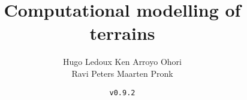 \documentclass[
  fontsize=10pt, %
  twoside=true, %
  secnumdepth=1, %
  numbers=noenddot, %
]{kaobook}
\begin{document}


\title{Computational modelling of terrains}
\author{Hugo Ledoux \hspace{10mm} Ken Arroyo Ohori\\ Ravi Peters \hspace{17mm} Maarten Pronk}
\date{\texttt{v0.9.2}}

\publishers{\vspace{15mm}\texttt{[image: front-back/nl\_joydivision.png]}}


\frontmatter %









\maketitle

\end{document}
